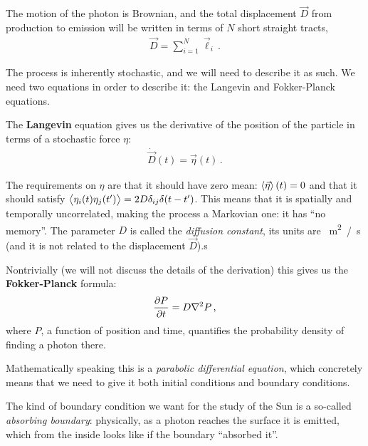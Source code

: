 \documentclass[main.tex]{subfiles}
\begin{document}

The motion of the photon is Brownian, and the total displacement \(\vec{D}\) from production to emission will be written in terms of \(N\) short straight tracts, 
%
\begin{align}
\vec{D} = \sum _{i=1}^{N} \vec{\ell}_i
\,.
\end{align}

The process is inherently stochastic, and we will need to describe it as such. 
We need two equations in order to describe it: the Langevin and Fokker-Planck equations.

The \textbf{Langevin} equation gives us the derivative of the position of the particle in terms of a stochastic force \(\eta\):
%
\begin{align}
  \dot{\vec{D}}(t) = \vec{\eta} (t)
\,.
\end{align}

The requirements on \(\eta \) are that it should have zero mean: \(\expval{\vec{\eta}}(t) = 0\) and that it should satisfy \(\expval{\eta _i (t) \eta_j (t')} = 2 D \delta_{ij} \delta (t - t')\).
This means that it is spatially and temporally uncorrelated, making the process a Markovian one: it has ``no memory''.
The parameter \(D\) is called the \emph{diffusion constant}, its units are \SI{}{m^2 /s} (and it is not related to the displacement \(\vec{D}\)).s 


Nontrivially (we will not discuss the details of the derivation) this gives us the \textbf{Fokker-Planck} formula: 
%
\begin{align}
  \pdv{P}{t} = D \nabla^2 P 
\,,
\end{align}
%
where \(P\), a function of position and time, quantifies the probability density of finding a photon there.

Mathematically speaking this is a \emph{parabolic differential equation}, which concretely means that we need to give it both initial conditions and boundary conditions. 


The kind of boundary condition we want for the study of the Sun is a so-called \emph{absorbing boundary}: physically, as a photon reaches the surface it is emitted, which from the inside looks like if the boundary ``absorbed it''.
\end{document}
